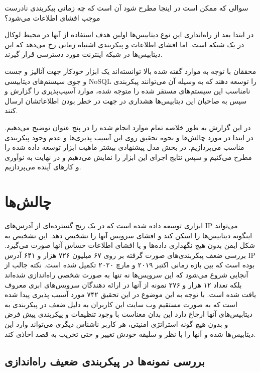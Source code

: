 \documentclass[10pt, a4paper]{article}
\begin{document}
سوالی که ممکن است در اینجا مطرح شود آن است که چه زمانی پیکربندی نادرست موجب
افشای اطلاعات می‌شود؟

در ابتدا بعد از راه‌اندازی این نوع دیتابیس‌ها اولین هدف استفاده از آنها در محیط
لوکال در یک شبکه است. اما افشای اطلاعات و پیکربندی اشتباه زمانی رخ می‌دهد که این
دیتابیس‌ها در شبکه اینترنت مورد دسترسی قرار گیرند.

محققان با توجه به موارد گفته شده بالا توانسته‌اند یک ابزار خودکار جهت آنالیز و
جست و جوی سیستم‌های دیتابیسی NoSQL را توسعه دهند که به وسیله آن می‌توانند
پیکربندی نامناسب این سیستم‌های مستقر شده را متوجه شده، موارد آسیب‌پذیری را گزارش
و سپس به صاحبان این دیتابیس‌ها هشداری در جهت در خطر بودن اطلاعاتشان ارسال کنند.

در این گزارش به طور خلاصه تمام موارد انجام شده را در پنج عنوان توضیح می‌دهیم. در
ابتدا در مورد چالش‌ها و نحوه تحقیق روی این آسیب پذیری‌ها و عدم وجود پیکربندی
مناسب می‌پردازیم. در بخش مدل پیشنهادی بیشتر ماهیت ابزار توسعه داده شده را مطرح
می‌کنیم و سپس نتایج اجرای این ابزار را نمایش می‌دهیم و در نهایت به نوآوری و
کار‌های آینده می‌پردازیم.

\section{چالش‌ها}

ابزاری توسعه داده شده است که در یک رنج گسترده‌ای از آدرس‌های IP می‌تواند اینگونه
دیتابیس‌ها را اسکن کند و افشای سرویس آنها را تشخیص دهد. این تشخیص به شکل ایمن
بدون هیچ نگهداری داده‌ها و یا افشای اطلاعات حساس آنها صورت می‌گیرد. بررسی ضعف
پیکربندی‌های صورت گرفته بر روی ۶۷ میلیون ۷۲۶ هزار و ۶۴۱ آدرس IP بوده است که بین
بازه زمانی اکتبر ۲۰۱۹ و مارچ ۲۰۲۰ تکمیل شده است. نکته جالب از آنجایی شروع می‌شود
که این سرویس‌ها نه تنها به صورت شخصی راه‌اندازی شده‌اند بلکه تعداد ۱۲ هزار و ۲۷۶
نمونه از آنها در ارائه دهندگان سرویس‌های ابری معروف یافت شده است.  با توجه به
این موضوع در این تحقیق ۷۴۲ مورد آسیب پذیری پیدا شده است که به صورت مستقیم وب
سایت این کاربران به دلیل ضعف در پیکربندی به دیتابیس‌های آنها ارجاع دارد این بدان
معناست با وجود تنظیمات و پیکربندی پیش فرض و بدون هیچ گونه استراتژی امنیتی، هر
کاربر ناشناس دیگری می‌تواند وارد این دیتابیس‌ها شده و آنها را با نظر و سلیقه
خودش تغییر و حتی تخریب به قصد اخاذی کند.

\subsection{بررسی نمونه‌ها در پیکربندی ضعیف راه‌اندازی}
\end{document}
